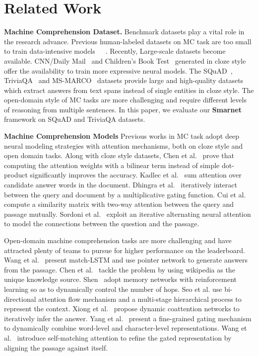 \documentclass[letterpaper]{article} %
\begin{document}
 \section{Related Work}
 \noindent\textbf{Machine Comprehension Dataset.} Benchmark datasets play a vital role in the research advance. Previous human-labeled datasets on MC task are too small to train data-intensive models~\cite{Richardson2013MCTestAC}~\cite{Berant2014ModelingBP}~\cite{Yu2016End}. Recently, Large-scale datasets become available. CNN/Daily Mail~\cite{Hermann2015TeachingMT} and Children's Book Test~\cite{Hill2015The} generated in cloze style offer the availability to train more expressive neural models. The SQuAD~\cite{rajpurkar2016squad}, TriviaQA~\cite{Joshi2017TriviaQAAL} and MS-MARCO~\cite{Nguyen2016MS} datasets provide large and high-quality datasets which extract answers from text spans instead of single entities in cloze style. The open-domain style of MC tasks are more challenging and require different levels of reasoning from multiple sentences. In this paper, we evaluate our \textbf{Smarnet} framework on SQuAD and TriviaQA datasets. 
 
 \noindent \textbf{Machine Comprehension Models} Previous works in MC task adopt deep neural modeling strategies with attention mechanisms, both on cloze style and open domain tasks. Along with cloze style datasets, Chen et al.~\cite{Chen2016A} prove that computing the attention weights with a bilinear term instead of simple dot-product significantly improves the accuracy. Kadlec et al.~\cite{Kadlec2016Text} sum attention over candidate answer words in the document. Dhingra et al.~\cite{Dhingra2017Gated} iteratively interact between the query and document by a multiplicative gating function. Cui et al.~\cite{Cui2016Attention} compute a similarity matrix with two-way attention between the query and passage mutually. Sordoni et al.~\cite{Sordoni2016Iterative} exploit an iterative alternating neural attention to model the connections between the question and the passage. 
 
 Open-domain machine comprehension tasks are more challenging and have attracted plenty of teams to pursue for higher performance on the leaderboard. Wang et al.~\cite{Wang2016Machine} present match-LSTM and use pointer network to generate answers from the passage. Chen et al.~\cite{chen2017reading} tackle the problem by using wikipedia as the unique knowledge source. Shen~\cite{shen2017reasonet} adopt memory networks with reinforcement learning so as to dynamically control the number of hops. Seo et al. \cite{seo2016bidirectional} use bi-directional attention flow mechanism and a multi-stage hierarchical process to represent the context. Xiong et al.~\cite{xiong2016dynamic} propose dynamic coattention networks to iteratively infer the answer. Yang et al.~\cite{Yang2016Words} present a fine-grained gating mechanism to dynamically combine word-level and character-level representations. Wang et al.~\cite{Wang2017GatedSN} introduce self-matching attention to refine the gated representation by aligning the passage against itself. 
 
\end{document}
